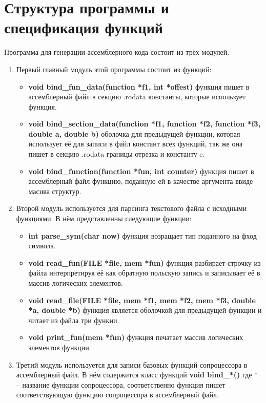 \documentclass[a4paper,12pt,titlepage,finall]{article}
\begin{document}
\newpage

\section{Структура программы и спецификация функций}

Программа для генерации ассемблерного кода состоит из трёх модулей.
\begin{enumerate}
  \item Первый главный модуль этой программы состоит из функций:
  \begin{itemize}
    \item {\bf \ttfamily void bind\_fun\_data(function *f1, int *offest)} функция пишет в ассемблерный файл в секцию .rodata константы, которые использует функция.
    \item {\bf \ttfamily void bind\_section\_data(function *f1, function *f2, \newline function *f3, double a, double b)} оболочка для предыдущей функции, которая использует её для записи в файл констант всех функций, так же она пишет в секцию .rodata границы отрезка и константу e.
    \item {\bf \ttfamily void bind\_function(function *fun, int counter)} функция пишет в ассемблерный файл функцию, поданную ей в качестве аргумента ввиде масива структур.
  \end{itemize}

  \item Второй модуль используется для парсинга текстового файла с исходными функциями. В нём представленны следующие функции:
  \begin{itemize}
    \item {\bf \ttfamily int parse\_sym(char now)} функция возращает тип поданного на фход символа.
    \item {\bf \ttfamily void read\_fun(FILE *file, mem *fun)} функция разбирает строчку из файла интерпретируя её как обратную польскую запись и записывает её в массив логических элементов.
    \item {\bf \ttfamily void read\_file(FILE *file, mem *f1, mem *f2, mem *f3, \newline double *a, double *b)} функция является оболочкой для предыдущей функции и читает из файла три функии.
    \item {\bf \ttfamily void print\_fun(mem *fun)} функция печатает массив логических элементов функции.
  \end{itemize}
  
  \item Третий модуль используется для записи базовых функций сопроцессора в ассемблерный файл. В нём содержится класс функций {\bf \ttfamily void bind\_*()} где * -- название функции сопроцессора, соответственно функция пишет соответствующую функцию сопроцессора в ассемблерный файл.

\end{enumerate}
\end{document}
